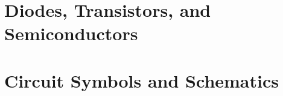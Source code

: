 \documentclass[12pt]{book}
\begin{document}
\section{Diodes, Transistors, and Semiconductors}
% 

\section{Circuit Symbols and Schematics}

% 
% 
% 
% 
% 
% 
% 
% 
% 
\end{document}
